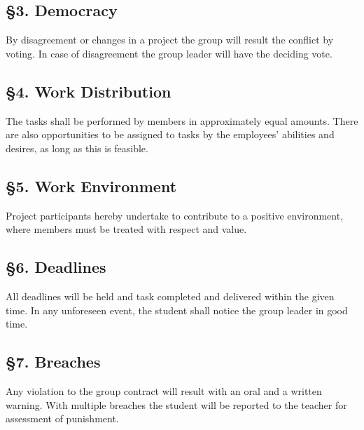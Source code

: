 \documentclass{article}
\begin{document}
\subsection*{§3. Democracy}
By disagreement or changes in a project the group will result the conflict by voting. In case of disagreement the group leader will have the deciding vote.

\subsection*{§4. Work Distribution}
The tasks shall be performed by members in approximately equal amounts. There are also opportunities to be assigned to tasks by the employees' abilities and desires, as long as this is feasible.

\subsection*{§5. Work Environment}
Project participants hereby undertake to contribute to a positive environment, where members must be treated with respect and value.

\subsection*{§6. Deadlines}
All deadlines will be held and task completed and delivered within the given time. In any unforeseen event, the student shall notice the group leader in good time.

\subsection*{§7. Breaches}
Any violation to the group contract will result with an oral and a written warning. With multiple breaches the student will be reported to the teacher for assessment of punishment.
\newpage
\end{document}
